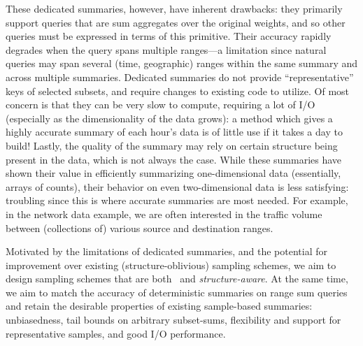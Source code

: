 \documentclass[11pt]{article}
\begin{document}
These dedicated summaries, however, have inherent drawbacks: they
primarily support queries that are sum aggregates over the original
weights, 
and so other queries must be expressed in terms of this primitive. 
Their accuracy rapidly degrades when the query spans multiple
ranges---a limitation since natural queries 
may span several (time, geographic) ranges within the same summary
and across multiple summaries.
Dedicated summaries do not provide ``representative'' keys of selected
subsets, and require changes to existing code to utilize.  
Of most concern is that they can be very slow to compute, requiring a
lot of I/O (especially as the dimensionality of the data grows): 
a method which gives a highly accurate summary of each hour's data
is of little use if it takes a day to build!
Lastly, the quality of the summary may rely on certain structure being
present in the data, which is not always the case. 
While these summaries have shown their value in efficiently
summarizing one-dimensional data (essentially, arrays of counts),
their behavior on even two-dimensional data is less satisfying:
troubling since this is where accurate summaries are most needed. 
For example, in the network data example, we are often interested in
the traffic volume between (collections of) 
various source and destination ranges. 













Motivated by the limitations of dedicated summaries, 
and the potential
for improvement over existing (structure-oblivious) sampling schemes, 
we aim to design sampling schemes that are both \varopt\ and
{\em structure-aware}.
At the same time, we aim to match the accuracy of deterministic summaries on
range sum queries and retain the desirable 
properties of existing sample-based summaries: unbiasedness, tail
bounds on arbitrary subset-sums, flexibility and support for
representative samples, and good I/O performance. 
\end{document}
